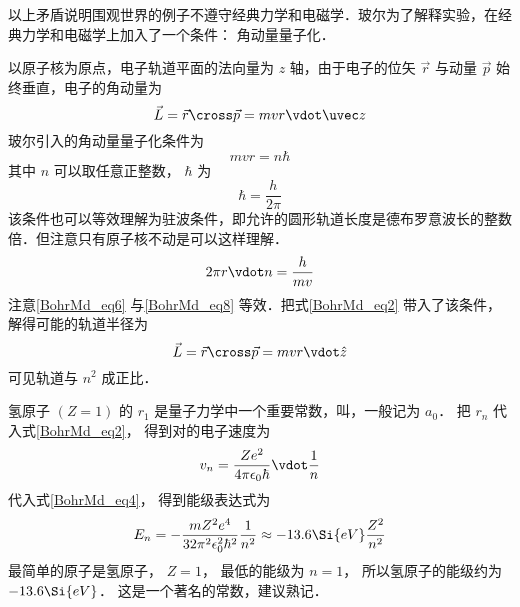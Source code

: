 以上矛盾说明围观世界的例子不遵守经典力学和电磁学．玻尔为了解释实验，在经典力学和电磁学上加入了一个条件： 角动量量子化．

以原子核为原点，电子轨道平面的法向量为 $z$ 轴，由于电子的位矢 $\vec r$ 与动量 $\vec p$ 始终垂直，电子的角动量为
\begin{equation}
\vec L = \vec r \cross \vec p = mvr \vdot \uvec z
\end{equation}
玻尔引入的角动量量子化条件为
\begin{equation}\label{BohrMd_eq6}
mvr = n\hbar 
\end{equation}
其中 $n$ 可以取任意正整数， $\hbar$ 为
\begin{equation}\label{BohrMd_eq7}
\hbar  = \frac{h}{2\pi}
\end{equation}
该条件也可以等效理解为驻波条件，即允许的圆形轨道长度是德布罗意波长的整数倍．但注意只有原子核不动是可以这样理解．
\begin{equation}\label{BohrMd_eq8}
2\pi r \vdot n = \frac{h}{mv}
\end{equation}
注意\autoref{BohrMd_eq6} 与\autoref{BohrMd_eq8} 等效．把式\autoref{BohrMd_eq2} 带入了该条件，解得可能的轨道半径为
\begin{equation}\label{BohrMd_eq9}
\vec L = \vec r \cross \vec p = mvr \vdot \hat z
\end{equation}
可见轨道与 $n^2$ 成正比．

氢原子 $(Z=1)$ 的 $r_1$ 是量子力学中一个重要常数，叫，一般记为 $a_0$． 把 $r_n$ 代入式\autoref{BohrMd_eq2}， 得到对的电子速度为
\begin{equation}\label{BohrMd_eq10}
v_n = \frac{Z e^2}{4\pi\epsilon_0\hbar} \vdot \frac{1}{n}
\end{equation}
代入式\autoref{BohrMd_eq4}， 得到能级表达式为
\begin{equation}\label{BohrMd_eq11}
E_n =  - \frac{mZ^2 e^4}{32\pi^2\epsilon_0^2 \hbar ^2} \frac{1}{n^2} \approx  - 13.6\Si{eV}\frac{Z^2}{n^2}
\end{equation}
最简单的原子是氢原子， $Z = 1$， 最低的能级为 $n = 1$， 所以氢原子的能级约为 $-13.6\Si{eV}$． 这是一个著名的常数，建议熟记．









